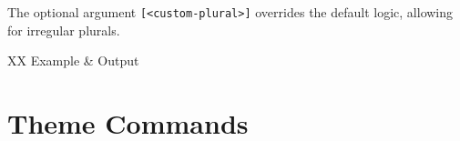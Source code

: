 \begin{macrolist}
{					The optional argument \verb|[<custom-plural>]| overrides the default logic, allowing for irregular plurals.


					\begin{RpgTable}{XX}
						Example & Output \\
					\end{RpgTable}
				}

			
		\end{macrolist}

	\section{Theme Commands}

